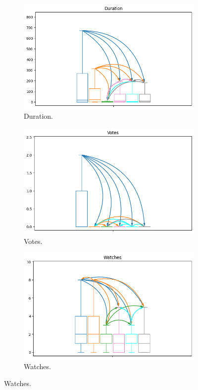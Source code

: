 \documentclass[10pt,a4paper,twocolumn]{article}
\begin{document}
\begin{figure}
    \begin{subfigure}{.4\textwidth}
      \centering
      \includegraphics[width=\linewidth]{rq2_mw/duration_high_conf_plot_arrows.png}
      \caption{Duration.}
    \end{subfigure}
    \begin{subfigure}{.4\textwidth}
      \centering
      \includegraphics[width=\linewidth]{rq2_mw/votes_high_conf_plot_arrows.png}
      \caption{Votes.}
    \end{subfigure}

    \begin{subfigure}{.4\textwidth}
      \centering
      \includegraphics[width=\linewidth]{rq2_mw/watches_high_conf_plot_arrows.png}
      \caption{Watches.}
    \end{subfigure}
      

\end{figure}
\end{document}
